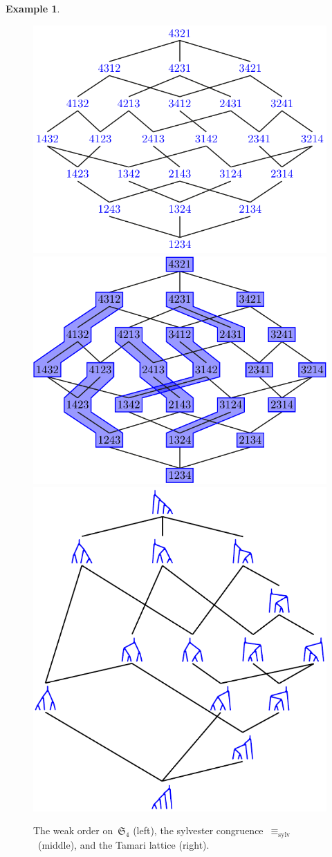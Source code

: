 \documentclass{amsart}
\theoremstyle{definition}
\newtheorem{example}[theorem]{Example}
\newcommand{\f}[1]{{\mathfrak{#1}}} %
\begin{document}
\begin{example}
\begin{figure}
	\centerline{\includegraphics[scale=.6]{weakOrderLeft4} \; \includegraphics[scale=.6]{weakOrderCongruence4} \; \includegraphics[scale=.48]{TamariLattice4}}
	\caption{The weak order on~$\f{S}_4$ (left), the sylvester congruence~$\equiv_\textrm{sylv}$~(middle), and the Tamari lattice (right). \cite[Fig.~1 \& 2]{PilaudSantos-quotientopes}}
	\label{fig:sylvesterCongruence}
\end{figure}
\end{example}
\end{document}
